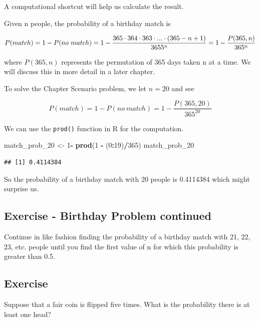 \documentclass[]{book}
\newenvironment{Shaded}{\begin{snugshade}}{\end{snugshade}}
\newcommand{\KeywordTok}[1]{\textcolor[rgb]{0.13,0.29,0.53}{\textbf{#1}}}
\newcommand{\DecValTok}[1]{\textcolor[rgb]{0.00,0.00,0.81}{#1}}
\newcommand{\StringTok}[1]{\textcolor[rgb]{0.31,0.60,0.02}{#1}}
\newcommand{\OperatorTok}[1]{\textcolor[rgb]{0.81,0.36,0.00}{\textbf{#1}}}
\newcommand{\NormalTok}[1]{#1}
\theoremstyle{definition}
\theoremstyle{definition}
\theoremstyle{definition}
\theoremstyle{remark}
\begin{document}
A computational shortcut will help us calculate the result.

Given n people, the probability of a birthday match is

\[P(match)=1-P(no \ match)=1-\frac{365 \cdot 364 \cdot 363 \cdot ... \cdot (365-n+1)}{3655^{n}}= \\ 1-\frac{P(365,n)}{365^{n}}\]

where \(P(365,n)\) represents the permutation of 365 days taken n at a
time. We will discuss this in more detail in a later chapter.

To solve the Chapter Scenario problem, we let \(n=20\) and see

\[P(match)=1-P(no \ match)=1-\frac{P(365,20)}{365^{20}}\]

We can use the \texttt{prod()} function in R for the computation.

\begin{Shaded}
\begin{Highlighting}[]
\NormalTok{match_prob_}\DecValTok{20}\NormalTok{ <-}\StringTok{ }\DecValTok{1}\OperatorTok{-}\StringTok{ }\KeywordTok{prod}\NormalTok{(}\DecValTok{1} \OperatorTok{-}\StringTok{ }\NormalTok{(}\DecValTok{0}\OperatorTok{:}\DecValTok{19}\NormalTok{)}\OperatorTok{/}\DecValTok{365}\NormalTok{)}
\NormalTok{match_prob_}\DecValTok{20}
\end{Highlighting}
\end{Shaded}

\begin{verbatim}
## [1] 0.4114384
\end{verbatim}

So the probability of a birthday match with 20 people is 0.4114384 which
might surprise us.

\subsection{Exercise - Birthday Problem
continued}\label{exercise---birthday-problem-continued}

Continue in like fashion finding the probability of a birthday match
with 21, 22, 23, etc. people until you find the first value of n for
which this probability is greater than 0.5.

\subsection{Exercise}\label{exercise}

Suppose that a fair coin is flipped five times. What is the probability
there is at least one head?
\end{document}
